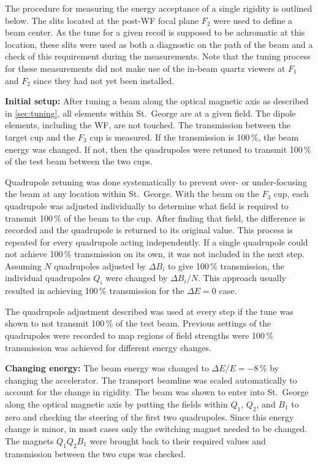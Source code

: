 The procedure for measuring the energy acceptance of a single rigidity is
outlined below. The slits located at the post-WF focal plane $F_2$
were used to define a beam center. As the tune for a given recoil is supposed
to be achromatic at this location, these slits were used as both a diagnostic
on the path of the beam and a check of this requirement during the
measurements. Note that the tuning process for these measurements did not make
use of the in-beam quartz viewers at $F_1$ and $F_2$ since they had not yet
been installed.

\textbf{Initial setup:}
After tuning a beam along the optical magnetic axis as described in
\ref{sec:tuning}, all elements within St.\ George are at a given field. The
dipole elements, including the WF, are not touched. The transmission
between the target cup and the $F_3$ cup is measured. If the transmission is
100\,\%, the beam energy was changed. If not, then the quadrupoles were retuned
to transmit 100\,\% of the test beam between the two cups.

Quadrupole retuning was done systematically to prevent over- or under-focusing
the beam at any location within St.\ George. With the beam on the $F_3$ cup,
each quadrupole was adjusted individually to determine what field is required
to transmit 100\,\% of the beam to the cup. After finding that field, the
difference is recorded and the quadrupole is returned to its original value.
This process is repeated for every quadrupole acting independently. If a single
quadrupole could not achieve 100\,\% transmission on its own, it was not included
in the next step. Assuming $N$ quadrupoles adjusted by $\Delta B_i$ to give
100\,\% transmission, the individual quadrupoles $Q_i$ were changed by
$\Delta B_i / N$. This approach usually resulted in achieving 100\,\%
transmission for the $\Delta E = 0$ case.

The quadrupole adjustment described was used at every step if the tune was
shown to not transmit 100\,\% of the test beam. Previous settings of the
quadrupoles were recorded to map regions of field strengths were 100\,\%
transmission was achieved for different energy changes.

\textbf{Changing energy:}
The beam energy was changed to $\Delta E/E = -8$\,\% by changing the accelerator.
The transport beamline was scaled automatically to account for the change in
rigidity. The beam was shown to enter into St.\ George along the optical
magnetic axis by putting the fields within $Q_1$, $Q_2$, and $B_1$ to zero and
checking the steering of the first two quadrupoles. Since this energy change is
minor, in most cases only the switching magnet needed to be changed. The
magnets $Q_1Q_2B_1$ were brought back to their required values and transmission
between the two cups was checked.

